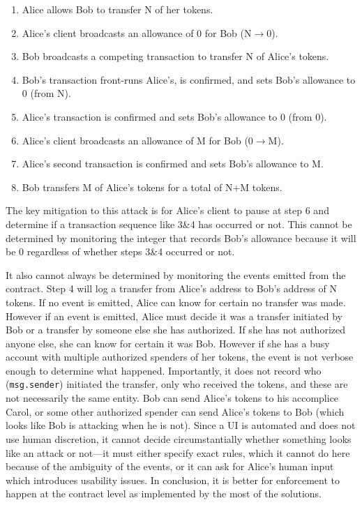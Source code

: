 \begin{enumerate}
	\item Alice allows Bob to transfer N of her tokens.
	\item Alice's client broadcasts an allowance of 0 for Bob (N$\rightarrow$0).
	\item Bob broadcasts a competing transaction to transfer N of Alice’s tokens.
	\item Bob's transaction front-runs Alice's, is confirmed, and sets Bob’s allowance to 0 (from N).
	\item Alice’s transaction is confirmed and sets Bob’s allowance to 0 (from 0).
	\item Alice's client broadcasts an allowance of M for Bob (0$\rightarrow$M).
	\item Alice’s second transaction is confirmed and sets Bob's allowance to M.
	\item Bob transfers M of Alice’s tokens for a total of N+M tokens.
\end{enumerate}

The key mitigation to this attack is for Alice's client to pause at step 6 and determine if a transaction sequence like 3\&4 has occurred or not. This cannot be determined by monitoring the integer that records Bob's allowance because it will be 0 regardless of whether steps 3\&4 occurred or not.

It also cannot always be determined by monitoring the events emitted from the contract. Step 4 will log a transfer from Alice's address to Bob's address of N tokens. If no event is emitted, Alice can know for certain no transfer was made. However if an event is emitted, Alice must decide it was a transfer initiated by Bob or a transfer by someone else she has authorized. If she has not authorized anyone else, she can know for certain it was Bob. However if she has a busy account with multiple authorized spenders of her tokens, the event is not verbose enough to determine what happened. Importantly, it does not record who (\texttt{msg.sender}) initiated the transfer, only who received the tokens, and these are not necessarily the same entity. Bob can send Alice's tokens to his accomplice Carol, or some other authorized spender can send Alice's tokens to Bob (which looks like Bob is attacking when he is not). Since a UI is automated and does not use human discretion, it cannot decide circumstantially whether something looks like an attack or not---it must either specify exact rules, which it cannot do here because of the ambiguity of the events, or it can ask for Alice's human input which introduces usability issues. In conclusion, it is better for enforcement to happen at the contract level as implemented by the most of the solutions.

